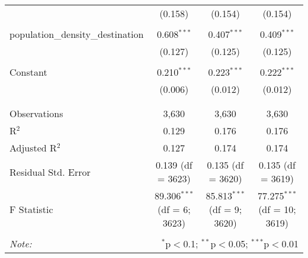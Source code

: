 \begin{table}[!htbp]
\begin{tabular}{@{\extracolsep{5pt}}lccc}
  & (0.158) & (0.154) & (0.154) \\ 
  & & & \\ 
 population\_density\_destination & 0.608$^{***}$ & 0.407$^{***}$ & 0.409$^{***}$ \\ 
  & (0.127) & (0.125) & (0.125) \\ 
  & & & \\ 
 Constant & 0.210$^{***}$ & 0.223$^{***}$ & 0.222$^{***}$ \\ 
  & (0.006) & (0.012) & (0.012) \\ 
  & & & \\ 
\hline \\[-1.8ex] 
Observations & 3,630 & 3,630 & 3,630 \\ 
R$^{2}$ & 0.129 & 0.176 & 0.176 \\ 
Adjusted R$^{2}$ & 0.127 & 0.174 & 0.174 \\ 
Residual Std. Error & 0.139 (df = 3623) & 0.135 (df = 3620) & 0.135 (df = 3619) \\ 
F Statistic & 89.306$^{***}$ (df = 6; 3623) & 85.813$^{***}$ (df = 9; 3620) & 77.275$^{***}$ (df = 10; 3619) \\ 
\hline 
\hline \\[-1.8ex] 
\textit{Note:}  & \multicolumn{3}{r}{$^{*}$p$<$0.1; $^{**}$p$<$0.05; $^{***}$p$<$0.01} \\ 
\end{tabular} 
\end{table} 
